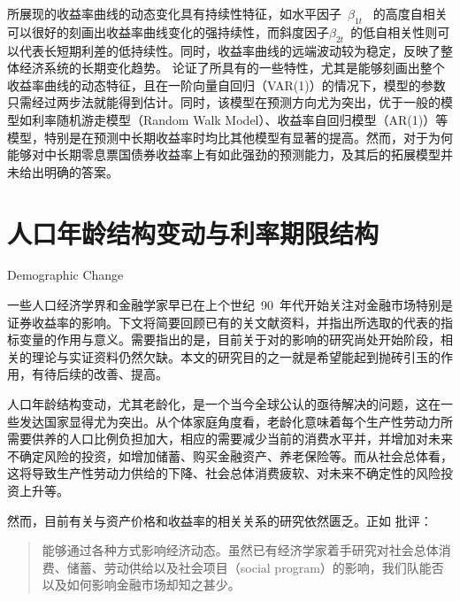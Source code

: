 \dns 所展现的收益率曲线的动态变化具有持续性特征，如水平因子~$\beta_{1t}$~ 的高度自相关可以很好的刻画出收益率曲线变化的强持续性，而斜度因子$\beta_{2t}$~的低自相关性则可以代表长短期利差的低持续性。同时，收益率曲线的远端波动较为稳定，反映了整体经济系统的长期变化趋势。
论证了\dns 所具有的一些特性，尤其是能够刻画出整个收益率曲线的动态特征，且在一阶向量自回归（VAR(1)）的情况下，模型的参数只需经过两步法就能得到估计。同时，该模型在预测方向尤为突出，优于一般的模型如利率随机游走模型（Random Walk Model）、收益率自回归模型（AR(1)）等模型，特别是\dns 在预测中长期收益率时均比其他模型有显著的提高。然而，对于为何\dns 能够对中长期零息票国债券收益率上有如此强劲的预测能力，及其后的拓展模型并未给出明确的答案。
 
\section{人口年龄结构变动与利率期限结构}{Demographic Change}

一些人口经济学界和金融学家早已在上个世纪~90~年代开始关注\dsf 对金融市场特别是证券收益率的影响。下文将简要回顾已有的关文献资料，并指出所选取的代表\dsf 的指标变量的作用与意义。需要指出的是，目前关于\dsf 对\ts 的影响的研究尚处开始阶段，相关的理论与实证资料仍然欠缺。本文的研究目的之一就是希望能起到抛砖引玉的作用，有待后续的改善、提高。


人口年龄结构变动，尤其老龄化，是一个当今全球公认的亟待解决的问题，这在一些发达国家显得尤为突出。从个体家庭角度看，老龄化意味着每个生产性劳动力所需要供养的人口比例负担加大，相应的需要减少当前的消费水平并，并增加对未来不确定风险的投资，如增加储蓄、购买金融资产、养老保险等。而从社会总体看，这将导致生产性劳动力供给的下降、社会总体消费疲软、对未来不确定性的风险投资上升等。

然而，目前有关\dsf 与资产价格和收益率的相关关系的研究依然匮乏。正如 批评：
\begin{quotation}
  \dsf 能够通过各种方式影响经济动态。虽然已有经济学家着手研究\dsf 对社会总体消费、储蓄、劳动供给以及社会项目（social program）的影响，我们队\dsf 能否以及如何影响金融市场却知之甚少。
\end{quotation}

